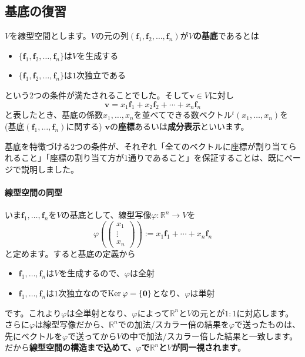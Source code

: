 \subsection{基底の復習}

$V$を線型空間とします。$V$の元の列$(\bm{f}_1, \bm{f}_2, \ldots, \bm{f}_n)$が\textbf{$V$の基底}であるとは
\begin{itemize}
\item $\{\bm{f}_1, \bm{f}_2, \ldots, \bm{f}_n\}$は$V$を生成する
\item $\{\bm{f}_1, \bm{f}_2, \ldots, \bm{f}_n\}$は$1$次独立である
\end{itemize}
という$2$つの条件が満たされることでした。そして$\bm{v} \in V$に対し
\[
\bm{v} = x_1 \bm{f}_1 + x_2 \bm{f}_2 + \cdots + x_n \bm{f}_n
\]
と表したとき、基底の係数$x_1, \ldots, x_n$を並べてできる数ベクトル${}^t(x_1, \ldots, x_n)$を  (基底$(\bm{f}_1, \ldots, \bm{f}_n)$に関する) $\bm{v}$の\textbf{座標}あるいは\textbf{成分表示}といいます。

基底を特徴づける$2$つの条件が、それぞれ「全てのベクトルに座標が割り当てられること」「座標の割り当て方が$1$通りであること」を保証することは、既に\pageref{subsec:basis}ページで説明しました。

\paragraph{線型空間の同型} いま$\bm{f}_1, \ldots, \bm{f}_n$を$V$の基底として、線型写像$\varphi\colon\mathbb{R}^n\rightarrow V$を
\[
\varphi\left(
\begin{pmatrix}
x_1 \\
\vdots \\
x_n
\end{pmatrix}
\right)
:= x_1 \bm{f}_1 + \cdots + x_n \bm{f}_n
\]
と定めます。すると基底の定義から
\begin{itemize}
\item $\bm{f}_1, \ldots, \bm{f}_n$は$V$を生成するので、$\varphi$は全射
\item $\bm{f}_1, \ldots, \bm{f}_n$は$1$次独立なので$\operatorname{Ker}\varphi = \{\boldsymbol{0}\}$となり、$\varphi$は単射
\end{itemize}
です。これより$\varphi$は全単射となり、$\varphi$によって$\mathbb{R}^n$と$V$の元とが$1:1$に対応します。さらに$\varphi$は線型写像だから、$\mathbb{R}^n$での加法/スカラー倍の結果を$\varphi$で送ったものは、先にベクトルを$\varphi$で送ってから$V$の中で加法/スカラー倍した結果と一致します。だから\textbf{線型空間の構造まで込めて、$\varphi$で$\mathbb{R}^n$と$V$が同一視されます}。

